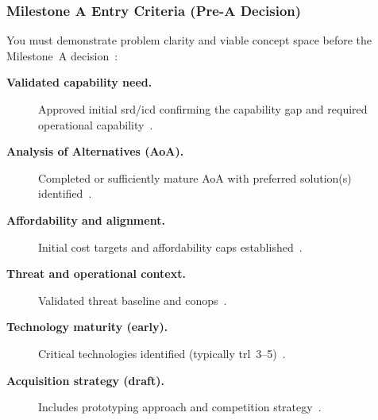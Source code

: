 \documentclass[../main.tex]{subfiles}
\begin{document}
\subsubsection{Milestone A Entry Criteria (Pre-A Decision)}
You must demonstrate problem clarity and viable concept space before the Milestone~A decision~\autocite{DoDI5000-85,edo-3-3-2-acq-milestones-phases-2025}:
\begin{description}
  \item[\textbf{Validated capability need.}] Approved initial \ac{srd}/\ac{icd} confirming the capability gap and required operational capability~\autocite{edo-3-3-2-acq-milestones-phases-2025}.
  \item[\textbf{Analysis of Alternatives (AoA).}] Completed or sufficiently mature AoA with preferred solution(s) identified~\autocite{edo-3-3-2-acq-milestones-phases-2025}.
  \item[\textbf{Affordability and alignment.}] Initial cost targets and affordability caps established~\autocite{edo-3-3-2-acq-milestones-phases-2025}.
  \item[\textbf{Threat and operational context.}] Validated threat baseline and \ac{conops}~\autocite{edo-3-3-2-acq-milestones-phases-2025}.
  \item[\textbf{Technology maturity (early).}] Critical technologies identified (typically \ac{trl}~3--5)~\autocite{edo-3-3-2-acq-milestones-phases-2025}.
  \item[\textbf{Acquisition strategy (draft).}] Includes prototyping approach and competition strategy~\autocite{edo-3-3-2-acq-milestones-phases-2025}.
\end{description}
\end{document}
